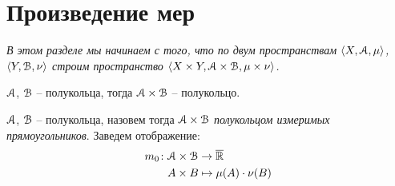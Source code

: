 \section{Произведение мер}

\textit{В этом разделе мы начинаем с того, что по двум пространствам
    $\langle X, \mathcal{A}, \mu \rangle$, $\langle Y, \mathcal{B}, \nu \rangle$ строим пространство
$\langle X \times Y, \mathcal{A} \times \mathcal{B}, \mu \times \nu \rangle$.}

\begin{lemma}
    $\mathcal{A}$, $\mathcal{B}$ -- полукольца, тогда $\mathcal{A} \times \mathcal{B}$ -- полукольцо.
\end{lemma}

\begin{definition}
    $\mathcal{A}$, $\mathcal{B}$ -- полукольца, назовем тогда $\mathcal{A} \times \mathcal{B}$ \textit{полукольцом
    измеримых прямоугольников}. Заведем отображение:
    \begin{align*}
        m_0 \colon &\mathcal{A} \times \mathcal{B} \to \overline{\mathbb{R}} \\
                   &A \times B \mapsto \mu(A) \cdot \nu(B)
    \end{align*}
\end{definition}

